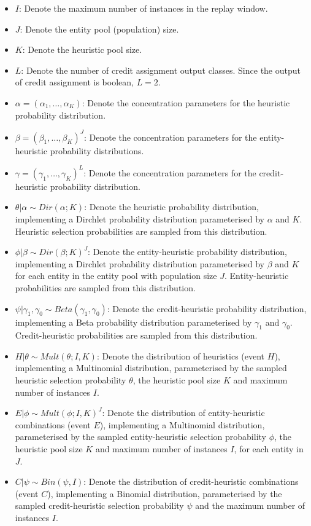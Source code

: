 \begin{itemize}
      \item $I$: Denote the maximum number of instances in the replay window.
      \item $J$: Denote the entity pool (population) size.
      \item $K$: Denote the heuristic pool size.
      \item $L$: Denote the number of credit assignment output classes. Since the output of credit assignment is boolean, $L = 2$.

      \item $\alpha = (\alpha_{1}, \dots, \alpha_{K})$: Denote the concentration parameters for the heuristic probability distribution.
      \item $\beta = (\beta_{1}, \dots, \beta_{K})^{J}$: Denote the concentration parameters for the entity-heuristic probability distributions.
      \item $\gamma = (\gamma_{1}, \dots, \gamma_{K})^{L}$: Denote the concentration parameters for the credit-heuristic probability distribution.

      \item $\theta \vert \alpha \sim Dir(\alpha; K)$: Denote the heuristic probability distribution, implementing a Dirchlet probability distribution parameterised by $\alpha$ and $K$. Heuristic selection probabilities are sampled from this distribution.
      \item $\phi \vert \beta \sim Dir(\beta; K)^{J}$: Denote the entity-heuristic probability distribution, implementing a Dirchlet probability distribution parameterised by $\beta$ and $K$ for each entity in the entity pool with population size $J$. Entity-heuristic probabilities are sampled from this distribution.
      \item $\psi \vert \gamma_{1}, \gamma_{0}  \sim Beta(\gamma_{1}, \gamma_{0})$: Denote the credit-heuristic probability distribution, implementing a Beta probability distribution parameterised by $\gamma_{1}$ and $\gamma_{0}$. Credit-heuristic probabilities are sampled from this distribution.

      \item $H \vert \theta \sim Mult(\theta; I, K)$: Denote the distribution of heuristics (event $H$), implementing a Multinomial distribution, parameterised by the sampled heuristic selection probability $\theta$, the heuristic pool size $K$ and maximum number of instances $I$.
      \item $E \vert \phi \sim Mult(\phi; I, K)^{J}$: Denote the distribution of entity-heuristic combinations (event $E$), implementing a Multinomial distribution, parameterised by the sampled entity-heuristic selection probability $\phi$, the heuristic pool size $K$ and maximum number of instances $I$, for each entity in $J$.
      \item $C \vert \psi \sim Bin(\psi, I)$: Denote the distribution of credit-heuristic combinations (event $C$), implementing a Binomial distribution, parameterised by the sampled credit-heuristic selection probability $\psi$ and the maximum number of instances $I$.
\end{itemize}

